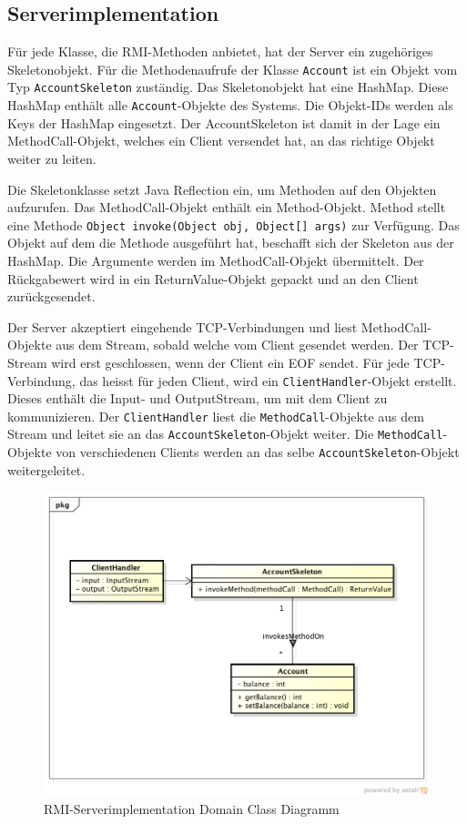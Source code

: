 \subsection{Serverimplementation}
\label{sec:serverimplementation}

Für jede Klasse, die RMI-Methoden anbietet, hat der Server ein
zuge\-hö\-ri\-ges Skeletonobjekt. Für die Methodenaufrufe
der Klasse \texttt{Account} ist ein Objekt vom Typ
\texttt{AccountSkeleton} zuständig. Das Skeletonobjekt hat eine HashMap. Diese
HashMap enthält alle \texttt{Account}-Objekte des Systems. Die Objekt-IDs
werden als Keys der HashMap eingesetzt. Der AccountSkeleton ist damit
in der Lage ein MethodCall-Objekt, welches ein Client versendet hat, an
das richtige Objekt weiter zu leiten. 

Die Skeletonklasse setzt Java Reflection ein, um Methoden auf den
Objekten aufzurufen. Das MethodCall-Objekt enthält ein
Method-Objekt. Method stellt eine Methode \verb|Object invoke(Object obj, Object[] args)|\- zur\- Ver\-füg\-ung. Das Objekt auf dem die Methode
ausgeführt hat, beschafft sich der Skeleton aus der HashMap. Die
Argumente werden im MethodCall-Objekt übermittelt. Der Rückgabewert
wird in ein ReturnValue-Objekt gepackt und an den Client zurückgesendet.

Der Server akzeptiert eingehende TCP-Verbindungen und liest MethodCall-Objekte aus
dem Stream, sobald welche vom Client gesendet
werden. Der TCP-Stream wird erst geschlossen, wenn der Client ein EOF
sendet. Für jede TCP-Verbindung, das heisst für jeden Client, wird
ein \texttt{ClientHandler}-Objekt erstellt. Dieses enthält die Input-
und OutputStream, um mit dem Client zu kommunizieren. Der
\texttt{ClientHandler} liest die \texttt{MethodCall}-Objekte aus dem
Stream und leitet sie an das \texttt{AccountSkeleton}-Objekt weiter. Die
\texttt{Method\-Call}-Objekte von verschiedenen Clients werden an das selbe
\-\texttt{Ac\-count\-Skeleton}-Objekt weitergeleitet.

\begin{figure}[ht]
  \centering
\includegraphics[scale = 0.5]{images_objectcaching/rmiServerImpl}  
  \caption{RMI-Serverimplementation Domain Class Diagramm}
  \label{fig:rmiserverimpl}
\end{figure}

